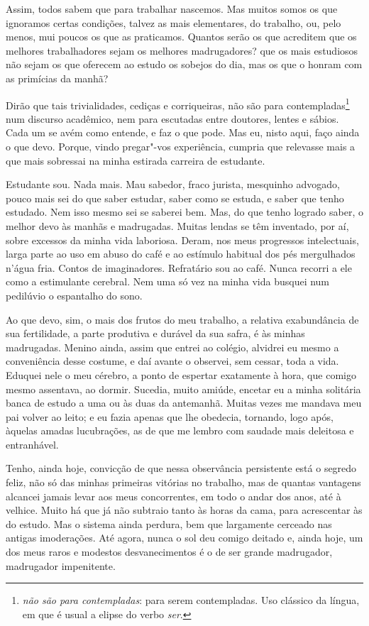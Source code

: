 Assim, todos sabem que para trabalhar nascemos. Mas muitos somos
os que ignoramos certas condições, talvez as mais elementares, do
trabalho, ou, pelo menos, mui poucos os que as praticamos. Quantos
serão os que acreditem que os melhores trabalhadores sejam os melhores
madrugadores? que os mais estudiosos não sejam os que oferecem ao
estudo os sobejos do dia, mas os que o honram com as primícias da
manhã?

Dirão que tais trivialidades, cediças e corriqueiras, não são para
contempladas\footnote{\textit{não são para contempladas}: 
para serem contempladas. Uso clássico da língua, em que é usual a elipse do verbo \emph{ser}.} num discurso
acadêmico, nem para escutadas entre doutores, lentes e sábios. Cada um
se avém como entende, e faz o que pode. Mas eu, nisto aqui, faço ainda
o que devo. Porque, vindo pregar"-vos experiência, cumpria que relevasse
mais a que mais sobressai na minha estirada carreira de estudante.

Estudante sou. Nada mais. Mau sabedor, fraco jurista, mesquinho
advogado, pouco mais sei do que saber estudar, saber como se estuda, e
saber que tenho estudado. Nem isso mesmo sei se saberei bem. Mas, do
que tenho logrado saber, o melhor devo às manhãs e madrugadas. Muitas
lendas se têm inventado, por aí, sobre excessos da minha vida
laboriosa. Deram, nos meus progressos intelectuais, larga parte ao uso
em abuso do café e ao estímulo habitual dos pés mergulhados
n'água fria. Contos de imaginadores. Refratário sou ao
café. Nunca recorri a ele como a estimulante cerebral. Nem uma só vez
na minha vida busquei num pedilúvio o espantalho do sono.

Ao que devo, sim, o mais dos frutos do meu trabalho, a relativa
exabundância de sua fertilidade, a parte produtiva e durável da sua
safra, é às minhas madrugadas. Menino ainda, assim que entrei ao
colégio, alvidrei eu mesmo a conveniência desse costume, e daí avante o
observei, sem cessar, toda a vida. Eduquei nele o meu cérebro, a ponto
de espertar exatamente à hora, que comigo mesmo assentava, ao dormir.
Sucedia, muito amiúde, encetar eu a minha solitária banca de estudo a
uma ou às duas da antemanhã. Muitas vezes me mandava meu pai volver ao
leito; e eu fazia apenas que lhe obedecia, tornando, logo após, àquelas
amadas lucubrações, as de que me lembro com saudade mais deleitosa e
entranhável.

Tenho, ainda
hoje, convicção de que nessa observância persistente está o segredo
feliz, não só das minhas primeiras vitórias no trabalho, mas de quantas
vantagens alcancei jamais levar aos meus concorrentes, em todo o andar
dos anos, até à velhice. Muito há que já não subtraio tanto às horas da
cama, para acrescentar às do estudo. Mas o sistema ainda perdura, bem
que largamente cerceado nas antigas imoderações. Até agora, nunca o sol
deu comigo deitado e, ainda hoje, um dos meus raros e modestos
desvanecimentos é o de ser grande madrugador, madrugador impenitente.

